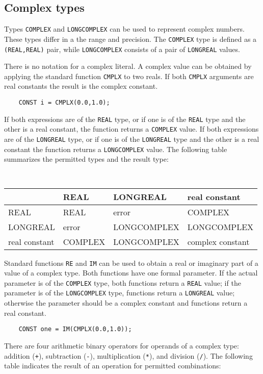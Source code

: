 \subsection{Complex types}\label{m2:ISO:complex}

Types \verb'COMPLEX' and \verb'LONGCOMPLEX' can be used to represent complex
numbers.  These types differ in a the range and precision. The
\verb'COMPLEX' type is defined as a \verb'(REAL,REAL)' pair, while \verb'LONGCOMPLEX'
consists of a pair of \verb'LONGREAL' values.

There is no notation for a complex literal. A complex value can
be obtained by applying the standard function {\tt CMPLX} to two reals.
If both {\tt CMPLX} arguments are real constants the result is the
complex constant.

\verb'    CONST i = CMPLX(0.0,1.0);'

If both expressions are of the \verb'REAL' type, or if one is of the
\verb'REAL' type and the other is a real constant, the function returns
a \verb'COMPLEX' value. If both expressions are of the \verb'LONGREAL' type,
or if one is of the \verb'LONGREAL' type and the other is a real constant
the function returns a \verb'LONGCOMPLEX' value. The following table
summarizes the permitted types and the result type:
\begin{center}
\small \tt
\begin{tabular}{l|lll}
              & REAL     & LONGREAL    & real constant    \\
\hline
REAL          & REAL     & error       & COMPLEX          \\
LONGREAL      & error    & LONGCOMPLEX & LONGCOMPLEX      \\
real constant & COMPLEX  & LONGCOMPLEX & complex constant
\end{tabular}
\end{center}

Standard functions {\tt RE} and {\tt IM} can be used to obtain
a real or imaginary part of a value of a complex type. Both
functions have one formal parameter. If the actual parameter is of the \verb'COMPLEX'
type, both functions return a \verb'REAL' value; if the parameter is of
the \verb'LONGCOMPLEX' type, functions return a \verb'LONGREAL' value; otherwise the
parameter should be a complex constant and functions return a real
constant.

\verb'    CONST one = IM(CMPLX(0.0,1.0));'

There are four arithmetic binary operators for operands of a complex
type: addition (\verb|+|), subtraction (\verb|-|), multiplication
(\verb|*|), and division (\verb|/|). The following table indicates
the result of an operation for permitted combinations:

